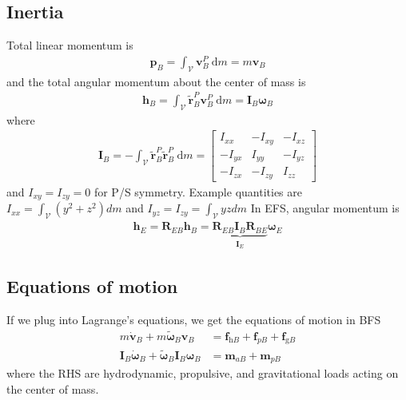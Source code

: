 \documentclass[10pt]{article}
\newcommand{\mbf}[1]{\mathbf{#1}}
\newcommand{\mcal}[1]{\mathcal{#1}} %
\newcommand{\be}{\begin{eqnarray}}
\newcommand{\ee}{\end{eqnarray}}
\newcommand{\ben}{\begin{eqnarray*}}
\newcommand{\een}{\end{eqnarray*}}
\newcommand{\tn}[1]{\textrm{#1}}
\begin{document}
\subsection{Inertia}
Total linear momentum is
\ben
\mbf{p}_B=\int_{\mathcal{V}} \mbf{v}_B^P \mathrm{~d} m
= m \mbf{v}_B
\een
and the total angular momentum about the center of mass is
\ben
\mbf{h}_B=\int_{\mathcal{V}} \tilde{\mbf{r}}_B^P \mbf{v}_B^P \mathrm{~d} m
= \mbf{I}_B \boldsymbol{\omega}_B
\een
%
where
\ben
\mbf{I}_B=-\int_{\mathcal{V}} \tilde{\mbf{r}}_B^P \tilde{\mbf{r}}_B^P \mathrm{~d} m=\left[\begin{array}{ccc}
		I_{x x}  & -I_{x y} & -I_{x z} \\
		-I_{y x} & I_{y y}  & -I_{y z} \\
		-I_{z x} & -I_{z y} & I_{z z}
	\end{array}\right]
\een
and $I_{xy} = I_{zy} = 0$ for P/S symmetry.
Example quantities are $\textstyle I_{xx} = \int_{\mcal{V}}\left(y^2+z^2\right) dm$ and $\textstyle I_{yz}=I_{zy}=\int_{\mcal{V}} yz dm$
In EFS, angular momentum is
\ben
\mbf{h}_E=\mbf{R}_{E B} \mbf{h}_B= \underbrace{\mbf{R}_{E B} \mbf{I}_B \mbf{R}_{B E}}_{\mbf{I}_E} \boldsymbol{\omega}_E
\een
\subsection{Equations of motion}
% 
If we plug into Lagrange's equations, we get the equations of motion in BFS
%
\begin{align}
	m\dot{\mbf{v}}_B + m \tilde{\boldsymbol{\omega}}_B\mbf{v}_B                                         & =  \mbf{f}_{\tn{h}B} + \mbf{f}_{pB}  + \mbf{f}_{\tn{g}B} \\
	\mbf{I}_B \dot{\boldsymbol{\omega}}_B+\tilde{\boldsymbol{\omega}}_B \mbf{I}_B \boldsymbol{\omega}_B & = \mbf{m}_{a B}+\mbf{m}_{p B}
\end{align}
where the RHS are hydrodynamic, propulsive, and gravitational loads acting on the center of mass.
% 
\end{document}
